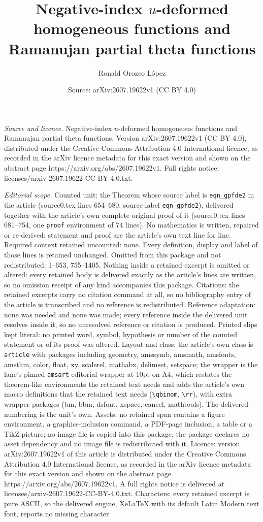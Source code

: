 \documentclass[10pt,a4paper]{amsart}
\title[Negative-index $u$-deformed homogeneous functions and Ramanu]{Negative-index $u$-deformed homogeneous functions and Ramanujan partial theta functions}
\author{Ronald Orozco L\'opez}
\date{Source: arXiv:2607.19622v1 (CC BY 4.0)}
\begin{document}
\maketitle

\noindent\emph{Source and licence.} Negative-index $u$-deformed homogeneous functions and Ramanujan partial theta functions. Version arXiv:2607.19622v1 (CC BY 4.0), distributed under the Creative Commons Attribution 4.0 International licence, as recorded in the arXiv licence metadata for this exact version and shown on the abstract page https://arxiv.org/abs/2607.19622v1. Full rights notice: licenses/arxiv-2607.19622-CC-BY-4.0.txt.\par\smallskip

\noindent\textit{Editorial scope.} Counted unit: the Theorem whose source label is \texttt{eqn\_gpfde2} in the article (source0.tex lines 654--680, source label \texttt{eqn\_gpfde2}), delivered together with the article's own complete original proof of it (source0.tex lines 681--754, one \texttt{proof} environment of 74 lines). No mathematics is written, repaired or re-derived: statement and proof are the article's own text line for line. Required context retained uncounted: none. Every definition, display and label of those lines is retained unchanged. Omitted from this package and not redistributed: 1--653, 755--1405. Nothing inside a retained excerpt is omitted or altered: every retained body is delivered exactly as the article's lines are written, so no omission receipt of any kind accompanies this package. Citations: the retained excerpts carry no citation command at all, so no bibliography entry of the article is transcribed and no reference is redistributed. Reference adaptation: none was needed and none was made; every reference inside the delivered unit resolves inside it, so no unresolved reference or citation is produced. Printed slips kept literal: no printed word, symbol, hypothesis or number of the counted statement or of its proof was altered. Layout and class: the article's own class is \texttt{article} with packages including geometry, amssymb, amsmath, amsfonts, amsthm, color, float, xy, scalerel, mathabx, delimset, setspace; the wrapper is the lane's pinned \texttt{amsart} editorial wrapper at 10pt on A4, which restates the theorem-like environments the retained text needs and adds the article's own macro definitions that the retained text needs (\texttt{\textbackslash qbinom}, \texttt{\textbackslash rr}), with extra wrapper packages (bm, bbm, dsfont, xspace, cancel, mathtools). The delivered numbering is the unit's own. Assets: no retained span contains a figure environment, a graphics-inclusion command, a PDF-page inclusion, a table or a TikZ picture; no image file is copied into this package, the package declares no asset dependency and no image file is redistributed with it. Licence: version arXiv:2607.19622v1 of this article is distributed under the Creative Commons Attribution 4.0 International licence, as recorded in the arXiv licence metadata for this exact version and shown on the abstract page https://arxiv.org/abs/2607.19622v1. A full rights notice is delivered at licenses/arxiv-2607.19622-CC-BY-4.0.txt. Characters: every retained excerpt is pure ASCII, so the delivered engine, XeLaTeX with its default Latin Modern text font, reports no missing character.
\end{document}
